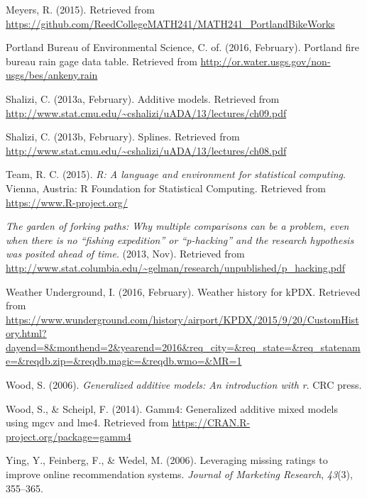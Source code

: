\documentclass[12pt,twoside]{reedthesis}
\begin{document}
  \hypertarget{ref-meyers2015}{}
  Meyers, R. (2015). Retrieved from
  \url{https://github.com/ReedCollegeMATH241/MATH241_PortlandBikeWorks}
  
  \hypertarget{ref-pdxrain}{}
  Portland Bureau of Environmental Science, C. of. (2016, February).
  Portland fire bureau rain gage data table. Retrieved from
  \url{http://or.water.usgs.gov/non-usgs/bes/ankeny.rain}
  
  \hypertarget{ref-cosmaadditive}{}
  Shalizi, C. (2013a, February). Additive models. Retrieved from
  \url{http://www.stat.cmu.edu/~cshalizi/uADA/13/lectures/ch09.pdf}
  
  \hypertarget{ref-cosmasplines}{}
  Shalizi, C. (2013b, February). Splines. Retrieved from
  \url{http://www.stat.cmu.edu/~cshalizi/uADA/13/lectures/ch08.pdf}
  
  \hypertarget{ref-Rlang}{}
  Team, R. C. (2015). \emph{R: A language and environment for statistical
  computing}. Vienna, Austria: R Foundation for Statistical Computing.
  Retrieved from \url{https://www.R-project.org/}
  
  \hypertarget{ref-gelman2013}{}
  \emph{The garden of forking paths: Why multiple comparisons can be a
  problem, even when there is no ``fishing expedition'' or ``p-hacking''
  and the research hypothesis was posited ahead of time}. (2013, Nov).
  Retrieved from
  \url{http://www.stat.columbia.edu/~gelman/research/unpublished/p_hacking.pdf}
  
  \hypertarget{ref-wunderground}{}
  Weather Underground, I. (2016, February). Weather history for kPDX.
  Retrieved from
  \url{https://www.wunderground.com/history/airport/KPDX/2015/9/20/CustomHistory.html?dayend=8\&monthend=2\&yearend=2016\&req_city=\&req_state=\&req_statename=\&reqdb.zip=\&reqdb.magic=\&reqdb.wmo=\&MR=1}
  
  \hypertarget{ref-wood2006}{}
  Wood, S. (2006). \emph{Generalized additive models: An introduction with
  r}. CRC press.
  
  \hypertarget{ref-gamm4}{}
  Wood, S., \& Scheipl, F. (2014). Gamm4: Generalized additive mixed
  models using mgcv and lme4. Retrieved from
  \url{https://CRAN.R-project.org/package=gamm4}
  
  \hypertarget{ref-ying2006}{}
  Ying, Y., Feinberg, F., \& Wedel, M. (2006). Leveraging missing ratings
  to improve online recommendation systems. \emph{Journal of Marketing
  Research}, \emph{43}(3), 355--365.


\end{document}
